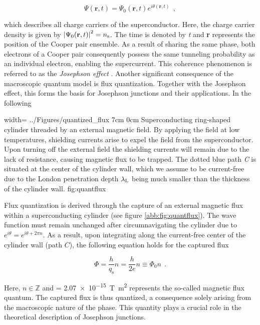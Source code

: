 \begin{equation}
\Psi(\textbf{r},t) = \Psi_0(\textbf{r},t)e^{i\theta(\textbf{r},t)} \ \ ,
\end{equation}

which describes all charge carriers of the superconductor. Here, the charge carrier density is given by $\left|\Psi_0(\textbf{r},t)\right|^2 = n_{\rm s}$. The time is denoted by \textit{t} and \textbf{r} represents the position of the Cooper pair ensemble. As a result of sharing the same phase, both electrons of a Cooper pair consequently possess the same tunneling probability as an individual electron, enabling the supercurrent. This coherence phenomenon is referred to as the \textit{Josephson effect} \cite{Josephson1962}. Another significant consequence of the macroscopic quantum model is flux quantization. Together with the Josephson effect, this forms the basis for Josephson junctions and their applications. In the following

{width=\textwidth}
{../Figures/quantized_flux}
{7cm}
{0cm}
{Superconducting ring-shaped cylinder threaded by an external magnetic field. By applying the field at low temperatures, shielding currents arise to expel the field from the superconductor. Upon turning off the external field the shielding currents will remain due to the lack of resistance, causing magnetic flux to be trapped. The dotted blue path \textit{C} is situated at the center of the cylinder wall, which we assume to be current-free due to the London penetration depth $\lambda_{\rm L}$ being much smaller than the thickness of the cylinder wall.} 
{fig:quantflux}

Flux quantization is derived through the capture of an external magnetic flux within a superconducting cylinder (see figure \ref{abb:fig:quantflux}). The wave function must remain unchanged after circumnavigating the cylinder due to $e^{i\theta} = e^{i\theta + 2\pi n}$. As a result, upon integrating along the current-free center of the cylinder wall (path $C$), the following equation holds for the captured flux

\begin{equation}
\Phi = \frac{h}{q_\mathrm{s}}n = \frac{h}{2e}n \equiv \Phi_0n \ \ .
\end{equation}

Here, $n\in\mathbb{Z}$ and \unit{\fq} = \qty{2.07e-15}{\tesla\metre\squared} \cite{CODATA2018} represents the so-called magnetic flux quantum. The captured flux is thus quantized, a consequence solely arising from the macroscopic nature of the phase. This quantity plays a crucial role in the theoretical description of Josephson junctions.



